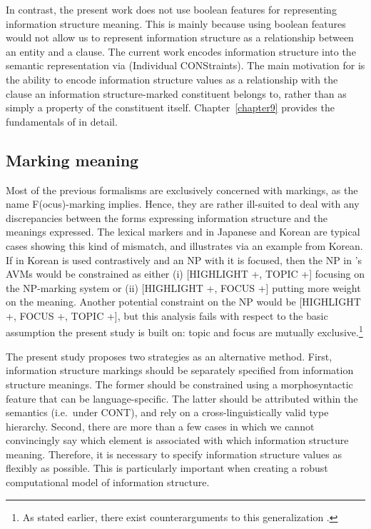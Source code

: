 In contrast, the present work does not use boolean features for
representing information structure meaning. This is mainly because
using boolean features would not allow us to represent information
structure as a relationship between an entity and a clause. The
current work encodes information structure into the semantic
representation via  (Individual CONStraints).
The main motivation for  is the ability to
encode information structure values as a relationship with the clause
an information structure-marked constituent belongs to, rather than as
simply a property of the constituent itself.  Chapter~\ref{chapter9}
provides the fundamentals of  in detail.




\subsection{Marking \vs meaning}
\label{8:ssec:hpsg:makring-meaning}

Most of the previous formalisms are exclusively concerned with
markings, as the name F(ocus)-marking implies.  Hence, they are rather
ill-suited to deal with any discrepancies between the forms expressing
information structure and the meanings expressed.
The lexical markers \wa and \nun in Japanese and Korean are typical
cases showing this kind of mismatch, and 
illustrates via an example from Korean.  If \nun in Korean is used
contrastively and an NP with it is focused, then the NP in
\citeauthor{kim:07}'s AVMs would be constrained as either (i) [HIGHLIGHT +,
  TOPIC +] focusing on the NP-marking system or (ii) [HIGHLIGHT +,
  FOCUS +] putting more weight on the meaning. Another potential
constraint on the NP would be [HIGHLIGHT +, FOCUS +, TOPIC +], but
this analysis fails with respect to the basic assumption the present
study is built on: topic and focus are mutually exclusive.\footnote{As
  stated earlier, there exist counterarguments to this generalization
  \citep{krifka:08}.}



The present study proposes two strategies as an alternative method.
First, information structure markings should be separately specified
from information structure meanings. The former should be constrained
using a morphosyntactic feature that can be language-specific. The
latter should be attributed within the semantics (i.e.\ under CONT),
and rely on a cross-linguistically valid type hierarchy. Second, there
are more than a few cases in which we cannot convincingly say which
element is associated with which information structure meaning.
Therefore, it is necessary to specify information structure values as
flexibly as possible. This is particularly important when creating a
robust computational model of information structure.




